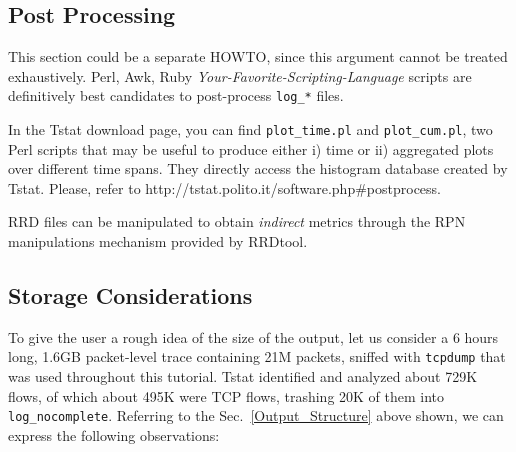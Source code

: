 \documentclass[11pt]{article}
\begin{document}
\subsection{Post Processing\label{Post_Processing}}


This section could be a separate HOWTO, since this
argument cannot be treated exhaustively. Perl, Awk, Ruby
\textit{Your-Favorite-Scripting-Language} scripts are definitively
best candidates to post-process \texttt{log\_*} files.



In the Tstat download page, you
can find \texttt{plot\_time.pl} and \texttt{plot\_cum.pl}, two Perl scripts that may be useful
to produce either i) time or ii) aggregated plots over different time spans.
They directly access the histogram database created by Tstat.
Please, refer to \textsf{http://tstat.polito.it/software.php\#postprocess}.



RRD files can be manipulated to obtain \textit{indirect} 
metrics through the RPN manipulations mechanism provided 
by RRDtool.

\subsection{Storage Considerations\label{Storage_Considerations}}


To give the user a rough idea of the size of the output,
let us consider a 6 hours long, 1.6GB packet-level trace containing 
21M packets, sniffed with \texttt{tcpdump} that was used throughout this tutorial.
Tstat identified and analyzed about 729K flows, of which about 495K were 
TCP flows, trashing 20K of them into \texttt{log\_nocomplete}.
Referring to the Sec.~\ref{Output_Structure} above shown,
we can express the following observations:
\end{document}

